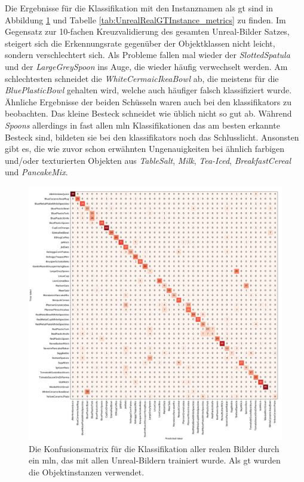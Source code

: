 Die Ergebnisse für die Klassifikation mit den Instanznamen als \gls{gt} sind in Abbildung \ref{fig:UnrealRealGTInstance_confMatrix} und Tabelle \ref{tab:UnrealRealGTInstance_metrics} zu finden. Im Gegensatz zur 10-fachen Kreuzvalidierung des gesamten Unreal-Bilder Satzes, steigert sich die Erkennungsrate gegenüber der Objektklassen nicht leicht, sondern verschlechtert sich. Als Probleme fallen mal wieder der \textit{SlottedSpatula} und der \textit{LargeGreySpoon} ins Auge, die wieder häufig verwechselt werden. Am schlechtesten schneidet die \textit{WhiteCermaicIkeaBowl} ab, die meistens für die \textit{BluePlasticBowl} gehalten wird, welche auch häufiger falsch klassifiziert wurde. Ähnliche Ergebnisse der beiden Schüsseln waren auch bei den \glspl{klassifikator} zu beobachten. Das kleine Besteck schneidet wie üblich nicht so gut ab. Während \textit{Spoons} allerdings in fast allen \gls{mln} Klassifikationen das am besten erkannte Besteck sind, bildeten sie bei den \glspl{klassifikator} noch das Schlusslicht. Ansonsten gibt es, die wie zuvor schon erwähnten Ungenauigkeiten bei ähnlich farbigen und/oder texturierten Objekten aus \textit{TableSalt}, \textit{Milk}, \textit{Tea-Iced}, \textit{BreakfastCereal} und \textit{PancakeMix}. \par

\begin{figure}
\centering
	\includegraphics[scale=.292]{img/chapter6/UnrealRealGTInstance.png}
\caption[Konfusionsmatrix der Objektinstanzen Klassifikation mit Unreal-Trainingsset und realem Testset]{Die Konfusionsmatrix für die Klassifikation aller realen Bilder durch ein \gls{mln}, das mit allen Unreal-Bildern trainiert wurde. Als \gls{gt} wurden die Objektinstanzen verwendet.}
\label{fig:UnrealRealGTInstance_confMatrix}
\end{figure} 

